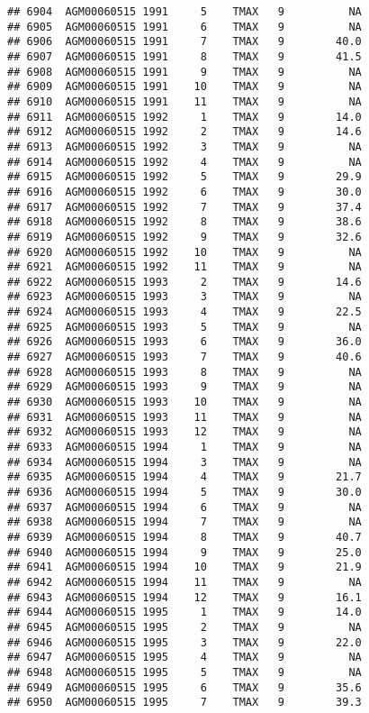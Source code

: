 \documentclass{article}\usepackage[]{graphicx}\usepackage[]{color}
\makeatletter
\newenvironment{kframe}{%
 \def\at@end@of@kframe{}%
 \ifinner\ifhmode%
  \def\at@end@of@kframe{\end{minipage}}%
  \begin{minipage}{\columnwidth}%
 \fi\fi%
 \def\FrameCommand##1{\hskip\@totalleftmargin \hskip-\fboxsep
 \colorbox{shadecolor}{##1}\hskip-\fboxsep
     \hskip-\linewidth \hskip-\@totalleftmargin \hskip\columnwidth}%
 \MakeFramed {\advance\hsize-\width
   \@totalleftmargin\z@ \linewidth\hsize
   \@setminipage}}%
 {\par\unskip\endMakeFramed%
 \at@end@of@kframe}
\newenvironment{knitrout}{}{} %
\makeatother
\begin{document}
\begin{knitrout}
\begin{kframe}
\begin{verbatim}
## 6904  AGM00060515 1991     5    TMAX   9          NA
## 6905  AGM00060515 1991     6    TMAX   9          NA
## 6906  AGM00060515 1991     7    TMAX   9        40.0
## 6907  AGM00060515 1991     8    TMAX   9        41.5
## 6908  AGM00060515 1991     9    TMAX   9          NA
## 6909  AGM00060515 1991    10    TMAX   9          NA
## 6910  AGM00060515 1991    11    TMAX   9          NA
## 6911  AGM00060515 1992     1    TMAX   9        14.0
## 6912  AGM00060515 1992     2    TMAX   9        14.6
## 6913  AGM00060515 1992     3    TMAX   9          NA
## 6914  AGM00060515 1992     4    TMAX   9          NA
## 6915  AGM00060515 1992     5    TMAX   9        29.9
## 6916  AGM00060515 1992     6    TMAX   9        30.0
## 6917  AGM00060515 1992     7    TMAX   9        37.4
## 6918  AGM00060515 1992     8    TMAX   9        38.6
## 6919  AGM00060515 1992     9    TMAX   9        32.6
## 6920  AGM00060515 1992    10    TMAX   9          NA
## 6921  AGM00060515 1992    11    TMAX   9          NA
## 6922  AGM00060515 1993     2    TMAX   9        14.6
## 6923  AGM00060515 1993     3    TMAX   9          NA
## 6924  AGM00060515 1993     4    TMAX   9        22.5
## 6925  AGM00060515 1993     5    TMAX   9          NA
## 6926  AGM00060515 1993     6    TMAX   9        36.0
## 6927  AGM00060515 1993     7    TMAX   9        40.6
## 6928  AGM00060515 1993     8    TMAX   9          NA
## 6929  AGM00060515 1993     9    TMAX   9          NA
## 6930  AGM00060515 1993    10    TMAX   9          NA
## 6931  AGM00060515 1993    11    TMAX   9          NA
## 6932  AGM00060515 1993    12    TMAX   9          NA
## 6933  AGM00060515 1994     1    TMAX   9          NA
## 6934  AGM00060515 1994     3    TMAX   9          NA
## 6935  AGM00060515 1994     4    TMAX   9        21.7
## 6936  AGM00060515 1994     5    TMAX   9        30.0
## 6937  AGM00060515 1994     6    TMAX   9          NA
## 6938  AGM00060515 1994     7    TMAX   9          NA
## 6939  AGM00060515 1994     8    TMAX   9        40.7
## 6940  AGM00060515 1994     9    TMAX   9        25.0
## 6941  AGM00060515 1994    10    TMAX   9        21.9
## 6942  AGM00060515 1994    11    TMAX   9          NA
## 6943  AGM00060515 1994    12    TMAX   9        16.1
## 6944  AGM00060515 1995     1    TMAX   9        14.0
## 6945  AGM00060515 1995     2    TMAX   9          NA
## 6946  AGM00060515 1995     3    TMAX   9        22.0
## 6947  AGM00060515 1995     4    TMAX   9          NA
## 6948  AGM00060515 1995     5    TMAX   9          NA
## 6949  AGM00060515 1995     6    TMAX   9        35.6
## 6950  AGM00060515 1995     7    TMAX   9        39.3

\end{verbatim}
\end{kframe}
\end{knitrout}
\end{document}
